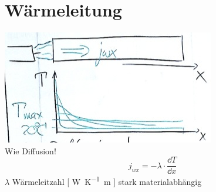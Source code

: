 \section{Wärmeleitung}
\includegraphics{Bild141} \\
Wie Diffusion!
\[ j_{wx} = -\lambda \cdot \frac{\dd T}{\dd x} \]
$\lambda$ Wärmeleitzahl [ \si{\watt\per\kelvin\metre} ] stark materialabhängig

